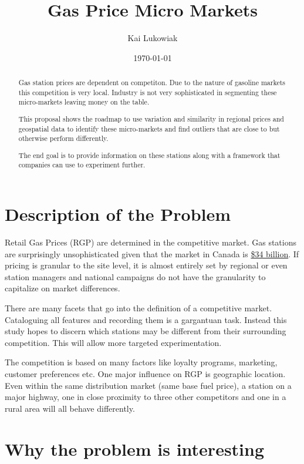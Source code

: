 \documentclass[11pt]{article}
\author{Kai Lukowiak}
\date{\today}
\title{Gas Price Micro Markets}
\begin{document}
\maketitle
\begin{abstract}

Gas station prices are dependent on competiton. Due to the nature of gasoline
markets this competition is very local. Industry is not very sophisticated in
segmenting these micro-markets leaving money on the table.

This proposal shows the roadmap to use variation and similarity in regional prices
and geospatial data to identify these micro-markets and find outliers that are
close to but otherwise perform differently. 

The end goal is to provide information on these stations along with a framework
that companies can use to experiment further.

\end{abstract}

\section{Description of the Problem}
\label{sec:orgad65e28}
Retail Gas Prices (RGP) are determined in the competitive market. Gas stations
are surprisingly unsophisticated given that the market in Canada is \href{https://www.ibisworld.ca/industry-trends/market-research-reports/retail-trade/gas-stations.html}{\$34 billion}.
If pricing is granular to the site level, it is almost entirely set by regional
or even station managers and national campaigns do not have the granularity to
capitalize on market differences.

There are many facets that go into the definition of a competitive market.
Cataloguing all features and recording them is a gargantuan task. Instead this
study hopes to discern which stations may be different from their surrounding
competition. This will allow more targeted experimentation.



The competition is based on many factors like loyalty programs, marketing,
customer preferences etc. One major influence on RGP is geographic
location. Even within the same distribution market (same base fuel price), a
station on a major highway, one in close proximity to three other competitors
and one in a rural area will all behave differently.


\section{Why the problem is interesting}
\label{sec:orgbcc4749}
\end{document}
